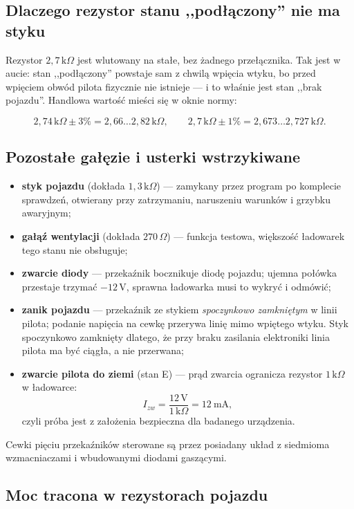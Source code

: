 \documentclass[a4paper,11pt]{article}
\newcommand{\ohm}{\,\Omega}
\newcommand{\kohm}{\,\mathrm{k}\Omega}
\newcommand{\volt}{\,\mathrm{V}}
\begin{document}
\subsection{Dlaczego rezystor stanu ,,podłączony'' nie ma styku}

Rezystor $2{,}7\kohm$ jest wlutowany na stałe, bez żadnego przełącznika. Tak jest
w aucie: stan ,,podłączony'' powstaje sam z chwilą wpięcia wtyku, bo przed wpięciem
obwód pilota fizycznie nie istnieje --- i to właśnie jest stan ,,brak pojazdu''.
Handlowa wartość mieści się w oknie normy:

\[
2{,}74\kohm \pm 3\% = 2{,}66\ldots2{,}82\kohm,
\qquad
2{,}7\kohm \pm 1\% = 2{,}673\ldots2{,}727\kohm .
\]

\subsection{Pozostałe gałęzie i usterki wstrzykiwane}

\begin{itemize}
\item \textbf{styk pojazdu} (dokłada $1{,}3\kohm$) --- zamykany przez program po
      komplecie sprawdzeń, otwierany przy zatrzymaniu, naruszeniu warunków
      i grzybku awaryjnym;
\item \textbf{gałąź wentylacji} (dokłada $270\ohm$) --- funkcja testowa, większość
      ładowarek tego stanu nie obsługuje;
\item \textbf{zwarcie diody} --- przekaźnik bocznikuje diodę pojazdu; ujemna połówka
      przestaje trzymać $-12\volt$, sprawna ładowarka musi to wykryć i odmówić;
\item \textbf{zanik pojazdu} --- przekaźnik ze stykiem \emph{spoczynkowo zamkniętym}
      w linii pilota; podanie napięcia na cewkę przerywa linię mimo wpiętego wtyku.
      Styk spoczynkowo zamknięty dlatego, że przy braku zasilania elektroniki linia
      pilota ma być ciągła, a nie przerwana;
\item \textbf{zwarcie pilota do ziemi} (stan E) --- prąd zwarcia ogranicza rezystor
      $1\kohm$ w ładowarce:
      \[
      I_{zw}=\frac{12\volt}{1\kohm}=12\ \mathrm{mA},
      \]
      czyli próba jest z założenia bezpieczna dla badanego urządzenia.
\end{itemize}

Cewki pięciu przekaźników sterowane są przez posiadany układ z siedmioma
wzmacniaczami i wbudowanymi diodami gaszącymi.

\subsection{Moc tracona w rezystorach pojazdu}
\end{document}
